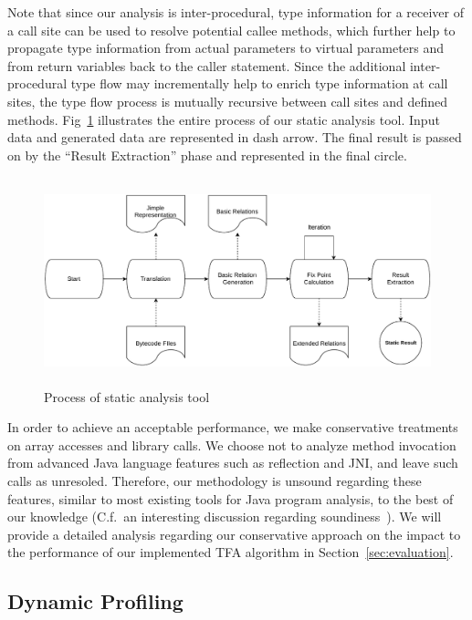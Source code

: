 \documentclass{fac}
\begin{document}
Note that since our analysis is inter-procedural, type information for a receiver of a call site can be used to resolve potential callee methods, which further help to propagate type information from actual parameters to virtual parameters and from return variables back to the caller statement. Since the additional inter-procedural type flow may incrementally help to enrich type information at call sites, the type flow process is mutually recursive between call sites and defined methods. %
Fig~\ref{fig:static-process} illustrates the entire process of our static analysis tool. Input data and generated data are represented in dash arrow. The final result is passed on by the ``Result Extraction'' phase and represented in the final circle.

\begin{figure}
\centering
\includegraphics[width=16cm,height=6cm]{static-process.pdf}
\caption{Process of static analysis tool}
\label{fig:static-process}
\end{figure}

In order to achieve an acceptable performance, we make conservative treatments on array accesses and library calls. We choose not to analyze method invocation from advanced Java language features such as reflection and JNI, and leave such calls as unresoled. Therefore, our methodology is unsound regarding these features, similar to most existing tools for Java program analysis, to the best of our knowledge (C.f.~an interesting discussion regarding soundiness~\cite{LivshitsSSLACGKMV15}). We will provide a detailed analysis regarding our conservative approach on the impact to the performance of our implemented TFA algorithm in Section~\ref{sec:evaluation}.



\subsection{Dynamic Profiling}\label{subsec:dynamic-profiler}
\end{document}
